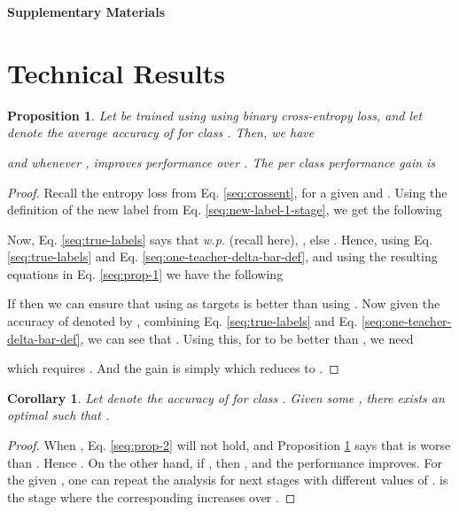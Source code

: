 \documentclass{article}
\newtheorem{proposition}{Proposition}
\newtheorem{corollary}{Corollary}
\begin{document}





\clearpage
\setcounter{equation}{0}
\setcounter{figure}{0}
\setcounter{table}{0}
\setcounter{section}{0}
\setcounter{page}{1}
\makeatletter
\renewcommand{\theequation}{S\arabic{equation}}
\renewcommand{\thefigure}{S\arabic{figure}}
\renewcommand{\bibnumfmt}[1]{[S#1]}
\renewcommand{\citenumfont}[1]{S#1}
\renewcommand{\thetable}{S\arabic{table}}

\begin{center}
\textbf{\large Supplementary Materials}
\end{center}

\section{Technical Results}











  

\begin{proposition} \label{sprop:delta-bar}
  Let  be trained using  using binary cross-entropy loss, and let  denote the average accuracy of  for class .
  Then, we have
  
  and whenever ,  improves performance over . The per class performance gain is  
\end{proposition}
\begin{proof}
Recall the entropy loss from Eq. \ref{seq:crossent}, for a given  and . 
Using the definition of the new label from Eq. \ref{seq:new-label-1-stage}, we get the following 

Now, Eq. \ref{seq:true-labels} says that {\it w.p.}  (recall  here), , else . 
Hence, using Eq. \ref{seq:true-labels} and Eq. \ref{seq:one-teacher-delta-bar-def}, and using the resulting equations in Eq. \ref{seq:prop-1} we have the following

If  then we can ensure that using  as targets is better than using . 
Now given the accuracy of  denoted by , combining Eq. \ref{seq:true-labels} and Eq. \ref{seq:one-teacher-delta-bar-def}, we can see that . Using this, for  to be better than ,  we need

which requires . And the gain is simply  which reduces to . 
\end{proof}

\begin{corollary} \label{scor:optimal-T}
Let  denote the accuracy of  for class . 
Given some , there exists an optimal 
such that . 
\end{corollary}
\begin{proof}
When , Eq. \ref{seq:prop-2} will not hold, and Proposition \ref{sprop:delta-bar} says that  is worse than . Hence . 
On the other hand, if , then , and the performance improves. 
For the given , one can repeat the analysis for next stages with different values of . 
 is the stage  where the corresponding  increases over . 
\end{proof}
\end{document}
